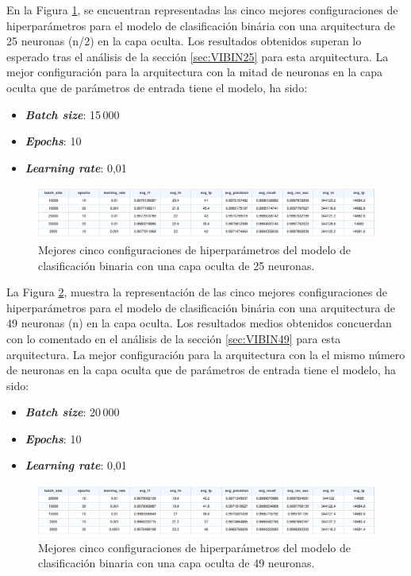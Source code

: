En la Figura \ref{fig:BINhs25}, se encuentran representadas las cinco mejores configuraciones de hiperparámetros para el modelo de clasificación binária con una arquitectura de 25 neuronas (n/2) en la capa oculta. Los resultados obtenidos superan lo esperado tras el análisis de la sección \ref{sec:VIBIN25} para esta arquitectura. La mejor configuración para la arquitectura con la mitad de neuronas en la capa oculta que de parámetros de entrada tiene el modelo, ha sido:
\begin{itemize}
	\item \textbf{\textit{Batch size}}: 15\,000
	\item \textbf{\textit{Epochs}}: 10
	\item \textbf{\textit{Learning rate}}: 0,01
\end{itemize}

\begin{figure}[H]
    \centering
    \includegraphics[width=1\textwidth]{./img/modelo/BINhs25.pdf}
    \caption{Mejores cinco configuraciones de hiperparámetros del modelo de clasificación binaria con una capa oculta de 25 neuronas.}
    \label{fig:BINhs25}
\end{figure}



La Figura \ref{fig:BINhs49}, muestra la representación de las cinco mejores configuraciones de hiperparámetros para el modelo de clasificación binária con una arquitectura de 49 neuronas (n) en la capa oculta. Los resultados medios obtenidos concuerdan con lo comentado en el análisis de la sección \ref{sec:VIBIN49} para esta arquitectura. La mejor configuración para la arquitectura con la el mismo número de neuronas en la capa oculta que de parámetros de entrada tiene el modelo, ha sido:
\begin{itemize}
	\item \textbf{\textit{Batch size}}: 20\,000
	\item \textbf{\textit{Epochs}}: 10
	\item \textbf{\textit{Learning rate}}: 0,01
\end{itemize}

\begin{figure}[H]
    \centering
    \includegraphics[width=1\textwidth]{./img/modelo/BINhs49.pdf}
    \caption{Mejores cinco configuraciones de hiperparámetros del modelo de clasificación binaria con una capa oculta de 49 neuronas.}
    \label{fig:BINhs49}
\end{figure}


